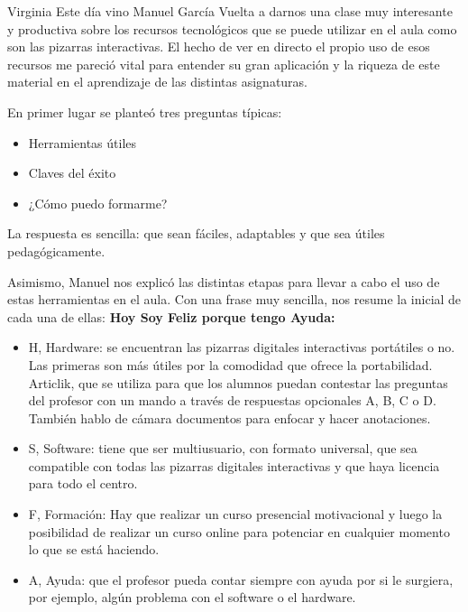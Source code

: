 \begin{opin}{\virgicolor}{Virginia}
Este día vino Manuel García Vuelta a darnos una clase muy interesante y productiva sobre los recursos tecnológicos que se puede utilizar en el aula como son las pizarras interactivas. El hecho de ver en directo el propio uso de esos recursos me pareció vital para entender su gran aplicación y la riqueza de este material en el aprendizaje de las distintas asignaturas.

En primer lugar se planteó tres preguntas típicas:

\begin{itemize}

\item Herramientas útiles 

\item Claves del éxito 

\item ¿Cómo puedo formarme? 
\end{itemize}

La respuesta es sencilla: que sean fáciles, adaptables y que sea útiles pedagógicamente.

Asimismo, Manuel nos explicó las distintas etapas para llevar a cabo el uso de estas herramientas en el aula. Con una frase muy sencilla, nos resume la inicial de cada una de ellas: \textbf{Hoy Soy Feliz porque tengo Ayuda:}

\begin{itemize}

\item H, Hardware: se encuentran las pizarras digitales interactivas portátiles o no. Las primeras son más útiles por la comodidad que ofrece la portabilidad. Articlik, que se utiliza para que los alumnos puedan contestar las preguntas del profesor con un mando a través de respuestas opcionales A, B, C o D. También hablo de cámara documentos para enfocar y hacer anotaciones. 

\item S, Software: tiene que ser multiusuario, con formato universal, que sea compatible con todas las pizarras digitales interactivas y que haya licencia para todo el centro. 

\item F, Formación: Hay que realizar un curso presencial motivacional y luego la posibilidad de realizar un curso online para potenciar en cualquier momento lo que se está haciendo. 

\item A, Ayuda: que el profesor pueda contar siempre con ayuda por si le surgiera, por ejemplo, algún problema con el software o el hardware. 
\end{itemize}


\end{opin}
